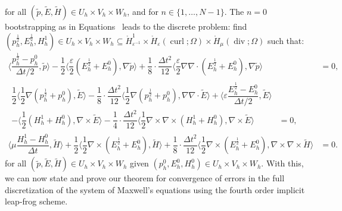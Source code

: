 \documentclass{amsart}
\theoremstyle{thmstyleone}%
\theoremstyle{thmstyletwo}%
\theoremstyle{thmstylethree}%
\DeclareMathOperator{\curl}{curl}
\def\divgn{\operatorname{div}}
\newcommand{\aInnerproduct}[2]{\bigl\langle #1, #2 \bigr\rangle}
\begin{document}
for all $(\widetilde{p}, \widetilde{E}, \widetilde{H}) \in U_h \times V_h \times W_h$, and for $n \in \{1, \dotso, N - 1\}$. 
The $n = 0$ bootstrapping as in Equations~ leads to the discrete problem: find $(p_h^{\frac{1}{2}}, E_h^{\frac{1}{2}}, H_h^1) \in U_h \times V_h \times W_h \subseteq \mathring{H}_{\varepsilon^{-1}}^1 \times \mathring{H}_{\varepsilon}(\curl; \Omega) \times \mathring{H}_{\mu}(\divgn; \Omega)$ such that:
\begin{subequations}
  \begin{align}
    \aInnerproduct{\dfrac{p_h^{\frac{1}{2}} - p_h^0}{\Delta t/2}}{\widetilde{p}} - \dfrac{1}{2} \aInnerproduct{\dfrac{\varepsilon}{2} \left( E_h^{\frac{1}{2}} + E_h^0 \right)}{\nabla \widetilde{p}} + \dfrac{1}{8} \cdot \dfrac{\Delta t^2}{12} \aInnerproduct{\dfrac{\varepsilon}{2} \nabla \nabla \cdot \left( E_h^{\frac{1}{2}} + E_h^0 \right)}{\nabla \widetilde{p}} &= 0, \label{eqn:maxwell_p0_lf4_full} \\
    \begin{split}
  \dfrac{1}{2}  \aInnerproduct{\dfrac{1}{2} \nabla \left(  p_h^{\frac{1}{2}} +  p_h^0 \right)}{\widetilde{E}} - \dfrac{1}{8} \cdot \dfrac{\Delta t^2}{12} \aInnerproduct{\dfrac{1}{2} \nabla \left(  p_h^{\frac{1}{2}} +  p_h^0 \right)}{\nabla \nabla \cdot \widetilde{E}} + \aInnerproduct{\varepsilon \dfrac{E_h^{\frac{1}{2}} - E_h^0}{\Delta t/2}}{\widetilde{E}}\\  - \aInnerproduct{\dfrac{1}{2} \left( H_h^1 + H_h^0 \right)}{\nabla \times \widetilde{E}} -\dfrac{1}{4} \cdot \dfrac{\Delta t^2}{12}  \aInnerproduct{\dfrac{1}{2} \nabla \times \nabla \times \left( H_h^1 + H_h^0 \right)}{\nabla \times \widetilde{E}} &= 0, \label{eqn:maxwell_E0_lf4_full} 
  \end{split} \\
    \aInnerproduct{\mu \dfrac{H_h^1 - H_h^0}{\Delta t}}{\widetilde{H}} + \dfrac{1}{2} \aInnerproduct{\dfrac{1}{2} \nabla \times \left(E_h^{\frac{1}{2}} + E_h^0 \right)}{\widetilde{H}} + \dfrac{1}{8} \cdot \dfrac{\Delta t^2}{12} \aInnerproduct{\dfrac{1}{2} \nabla \times \left(E_h^{\frac{1}{2}} + E_h^0 \right)}{ \nabla \times \nabla \times  \widetilde{H}} &= 0. \label{eqn:maxwell_H0_lf4_full}
  \end{align}
\end{subequations}
for all $(\widetilde{p}, \widetilde{E}, \widetilde{H}) \in U_h \times V_h \times W_h$ given $(p_h^0, E_h^0, H_h^0) \in U_h \times V_h \times W_h$. 
With this, we can now state and prove our theorem for convergence of errors in the full discretization of the system of Maxwell's equations using the fourth order implicit leap-frog scheme.
\end{document}
